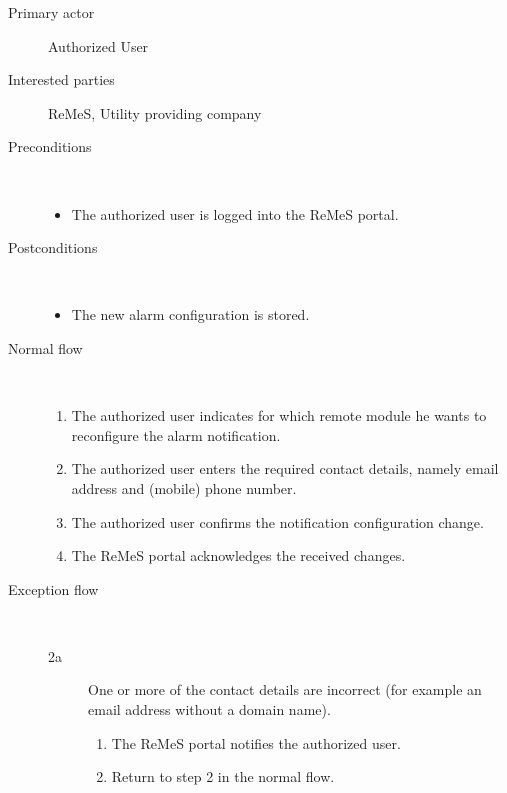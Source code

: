 \begin{description}
	\item[Primary actor] Authorized User
	\item[Interested parties] ReMeS, Utility providing company
	\item[Preconditions] \ 
	\begin{itemize}
		\item The authorized user is logged into the ReMeS portal.
	\end{itemize}
	\item[Postconditions] \ 
	\begin{itemize}
		\item The new alarm configuration is stored.
	\end{itemize}
	\item[Normal flow] \ 
	\begin{enumerate}
	  	\item The authorized user indicates for which remote module he wants to
	  	reconfigure the alarm notification.
	  	\item The authorized user enters the required contact
	  	details, namely email address and (mobile) phone number.
	  	\item The authorized user confirms the notification configuration
	  	change.
	  	\item The ReMeS portal acknowledges the received changes.
	\end{enumerate}
	\item[Exception flow] \ 
	\begin{description}
		\item[2a] One or more of the contact details are incorrect (for example an
		email address without a domain name).
		\begin{enumerate}
		  \item The ReMeS portal notifies the authorized user.
		  \item Return to step 2 in the normal flow.
		\end{enumerate}
	\end{description}
\end{description}